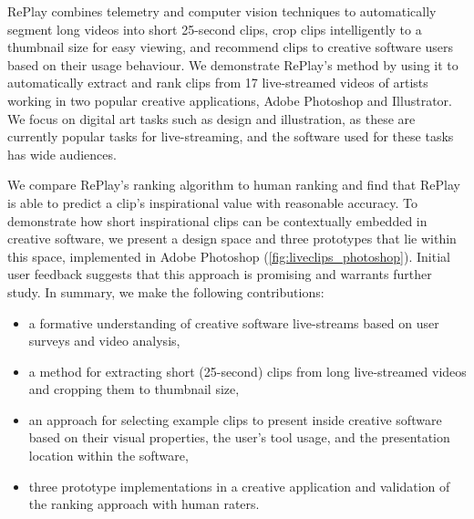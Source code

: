 RePlay combines telemetry and computer vision techniques to automatically segment long videos into short 25-second clips, crop clips intelligently to a thumbnail size for easy viewing, and recommend clips to creative software users based on their usage behaviour. We demonstrate RePlay's method by using it to automatically extract and rank clips from 17 live-streamed videos of artists working in two popular creative applications, Adobe Photoshop and Illustrator. We focus on digital art tasks such as design and illustration, as these are currently popular tasks for live-streaming, and the software used for these tasks has wide audiences.

We compare RePlay's ranking algorithm to human ranking and find that RePlay is able to predict a clip's inspirational value with reasonable accuracy. To demonstrate how short inspirational clips can be contextually embedded in creative software, we present a design space and three prototypes that lie within this space, implemented in Adobe Photoshop (\autoref{fig:liveclips_photoshop}). Initial user feedback suggests that this approach is promising and warrants further study. In summary, we make the following contributions:

\begin{itemize}
\item a formative understanding of creative software live-streams based on user surveys and video analysis,
\item a method for extracting short (25-second) clips from long live-streamed videos and cropping them to thumbnail size,
\item an approach for selecting example clips to present inside creative software based on their visual properties, the user's tool usage, and the presentation location within the software,
\item three prototype implementations in a creative application and validation of the ranking approach with human raters. 
\end{itemize}

